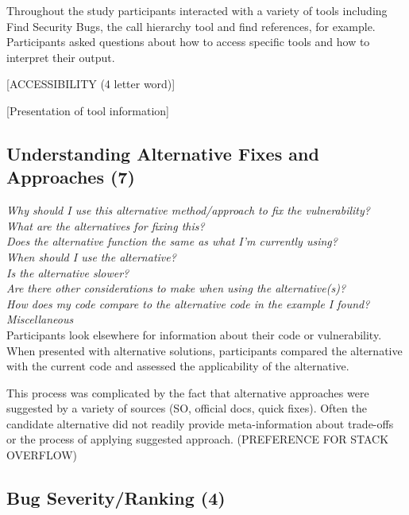 \documentclass[conference]{IEEEtran}
\begin{document}
Throughout the study participants interacted with a variety of tools including Find Security Bugs, the call hierarchy tool and find references, for example. Participants asked questions about how to access specific tools and how to interpret their output.

[ACCESSIBILITY (4 letter word)]

[Presentation of tool information]




\noindent\subsection{\textbf{Understanding Alternative Fixes and Approaches (7)}}

\noindent\emph{Why should I use this alternative method/approach to fix the vulnerability?} \\
\emph{What are the alternatives for fixing this?} \\
\emph{Does the alternative function the same as what I'm currently using?} \\
\emph{When should I use the alternative?} \\
\emph{Is the alternative slower?} \\
\emph{Are there other considerations to make when using the alternative(s)?} \\
\emph{How does my code compare to the alternative code in the example I found?} \\
\emph{Miscellaneous} \\

Participants look elsewhere for information about their code or vulnerability. When presented with alternative solutions, participants compared the alternative with the current code and assessed the applicability of the alternative. 

This process was complicated by the fact that alternative approaches were suggested by a variety of sources (SO, official docs, quick fixes). Often the candidate alternative did not readily provide meta-information about trade-offs or the process of applying suggested approach. (PREFERENCE FOR STACK OVERFLOW)


\noindent\subsection{\textbf{Bug Severity/Ranking (4)}}
\end{document}
